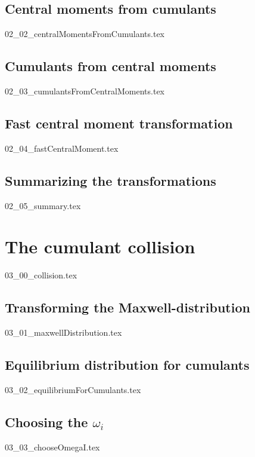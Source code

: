 \documentclass[12pt,a4paper,twoside]{article}
\begin{document}
\subsection{Central moments from cumulants}
\label{sub: Central moments from cumulants}
{02_02_centralMomentsFromCumulants.tex}

\subsection{Cumulants from central moments}
\label{sub: Cumulants from central moments}
{02_03_cumulantsFromCentralMoments.tex}

\subsection{Fast central moment transformation}
\label{sub: Fast central moment transformation}
{02_04_fastCentralMoment.tex}

\subsection{Summarizing the transformations}
\label{sub: Summarizing the transformations}
{02_05_summary.tex}

\section{The cumulant collision}
\label{sec: The cumulant collision}
{03_00_collision.tex}

\subsection{Transforming the Maxwell-distribution}
\label{sub: Transforming the Maxwell-distribution}
{03_01_maxwellDistribution.tex}

\subsection{Equilibrium distribution for cumulants}
\label{sub: Equilibrium distribution for cumulants}
{03_02_equilibriumForCumulants.tex}

\subsection{Choosing the \texorpdfstring{$\omega_i$}{omega i}}
\label{sub: Choosing the omega i}
{03_03_chooseOmegaI.tex}
\end{document}
